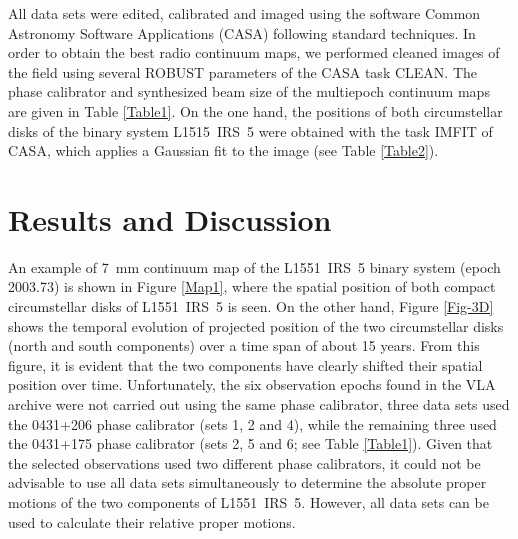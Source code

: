 \documentclass[debug]{rmaa}
\begin{document}
All data sets were edited, calibrated and imaged using the software Common Astronomy
Software Applications (CASA) following standard techniques.
In order to obtain the best radio continuum maps, we performed cleaned images of the field
using several ROBUST parameters of the CASA task CLEAN.
The phase calibrator and synthesized beam size of the multiepoch continuum maps
are given in Table \ref{Table1}. On the one hand, the positions of both circumstellar
disks of the binary system L1515~IRS~5 were obtained with the task IMFIT of CASA, 
which applies a Gaussian fit to the image (see Table \ref{Table2}).


\section{Results and Discussion}
\label{results}

An example of 7~mm continuum map of the L1551~IRS~5 binary system (epoch 2003.73) 
is shown in Figure \ref{Map1}, where the spatial position of both compact 
circumstellar disks of L1551~IRS~5 is seen. On the other hand, Figure \ref{Fig-3D}
shows the temporal evolution of projected position of the two circumstellar disks 
(north and south components) over a time span of about 15 years. From this figure,
it is evident that the two components have clearly shifted their spatial position 
over time. Unfortunately, the six observation epochs found in the VLA archive
were not carried out using the same phase calibrator, three data sets used the 0431+206
phase calibrator (sets 1, 2 and 4), while the remaining three used the 0431+175 phase
calibrator (sets 2, 5 and 6; see Table \ref{Table1}). Given that the selected observations
used two different phase calibrators, it could not be advisable to use all data sets
simultaneously to determine the absolute proper motions of the two components of
L1551~IRS~5. However, all data sets can be used to calculate their relative proper 
motions.
\end{document}
